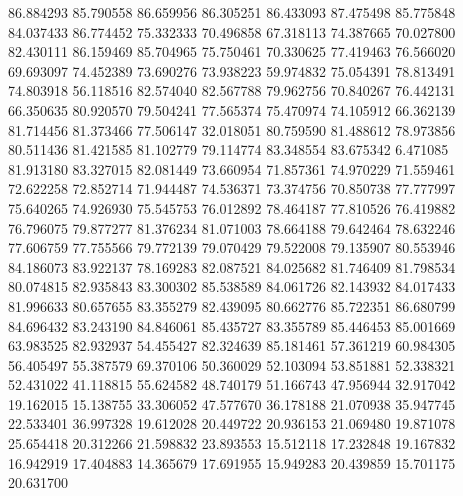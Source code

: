86.884293
85.790558
86.659956
86.305251
86.433093
87.475498
85.775848
84.037433
86.774452
75.332333
70.496858
67.318113
74.387665
70.027800
82.430111
86.159469
85.704965
75.750461
70.330625
77.419463
76.566020
69.693097
74.452389
73.690276
73.938223
59.974832
75.054391
78.813491
74.803918
56.118516
82.574040
82.567788
79.962756
70.840267
76.442131
66.350635
80.920570
79.504241
77.565374
75.470974
74.105912
66.362139
81.714456
81.373466
77.506147
32.018051
80.759590
81.488612
78.973856
80.511436
81.421585
81.102779
79.114774
83.348554
83.675342
6.471085
81.913180
83.327015
82.081449
73.660954
71.857361
74.970229
71.559461
72.622258
72.852714
71.944487
74.536371
73.374756
70.850738
77.777997
75.640265
74.926930
75.545753
76.012892
78.464187
77.810526
76.419882
76.796075
79.877277
81.376234
81.071003
78.664188
79.642464
78.632246
77.606759
77.755566
79.772139
79.070429
79.522008
79.135907
80.553946
84.186073
83.922137
78.169283
82.087521
84.025682
81.746409
81.798534
80.074815
82.935843
83.300302
85.538589
84.061726
82.143932
84.017433
81.996633
80.657655
83.355279
82.439095
80.662776
85.722351
86.680799
84.696432
83.243190
84.846061
85.435727
83.355789
85.446453
85.001669
63.983525
82.932937
54.455427
82.324639
85.181461
57.361219
60.984305
56.405497
55.387579
69.370106
50.360029
52.103094
53.851881
52.338321
52.431022
41.118815
55.624582
48.740179
51.166743
47.956944
32.917042
19.162015
15.138755
33.306052
47.577670
36.178188
21.070938
35.947745
22.533401
36.997328
19.612028
20.449722
20.936153
21.069480
19.871078
25.654418
20.312266
21.598832
23.893553
15.512118
17.232848
19.167832
16.942919
17.404883
14.365679
17.691955
15.949283
20.439859
15.701175
20.631700
